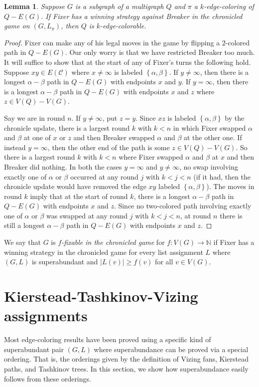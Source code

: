 \documentclass[12pt,reqno]{amsart}
\theoremstyle{plain}
\newtheorem{lem}[thm]{Lemma}
\theoremstyle{definition}
\theoremstyle{remark}
\newcommand{\fancy}[1]{\mathcal{#1}}
\newcommand{\C}[1]{\fancy{C}_{#1}}
\newcommand{\IN}{\mathbb{N}}
\newcommand{\set}[1]{\left\{ #1 \right\}}
\newcommand{\card}[1]{\left|#1\right|}
\newcommand{\func}[3]{#1\colon #2 \rightarrow #3}
\renewcommand{\C}{\fancy{C}}
\begin{document}
\begin{lem}\label{WinningChronicledGameEdgeColors}
Suppose $G$ is a subgraph of a multigraph $Q$ and $\pi$ a $k$-edge-coloring of 
$Q - E(G)$.  If Fixer has a winning strategy against Breaker in the chronicled
game on $(G, L_\pi)$, then $Q$ is $k$-edge-colorable.
\end{lem}
\begin{proof}
Fixer can make any of his legal moves in the game by flipping a $2$-colored path in $Q - E(G)$. Our only worry is that we have restricted Breaker too much.  It will suffice to show that at the start of any of Fixer's turns the following hold. Suppose $xy \in E(\C)$ where $x \ne \infty$ is labeled $\set{\alpha, \beta}$. If $y \ne \infty$, then there is a longest $\alpha-\beta$ path in $Q - E(G)$ with endpoints $x$ and $y$.  If $y = \infty$, then there is a longest $\alpha-\beta$ path in $Q - E(G)$ with endpoints $x$ and $z$ where $z \in V(Q) - V(G)$.

Say we are in round $n$. If $y \ne \infty$, put $z = y$. Since
$xz$ is labeled $\set{\alpha, \beta}$ by the chronicle update, there is a
largest round $k$ with $k < n$ in which Fixer swapped $\alpha$ and $\beta$ at
one of $x$ or $z$ and then Breaker swapped $\alpha$ and $\beta$ at the other
one.  If instead $y = \infty$, then the other end of the path is some $z \in
V(Q) - V(G)$.  So there is a largest round $k$ with $k < n$ where Fixer swapped
$\alpha$ and $\beta$ at $x$ and then Breaker did nothing.  In both the cases
$y=\infty$ and $y\ne \infty$, no swap involving exactly one of $\alpha$ or
$\beta$ occurred at any round $j$ with $k < j < n$ (if it had, then the
chronicle update would have removed the edge $xy$ labeled
$\set{\alpha,\beta}$).  The moves in round $k$ imply that at the start of round
$k$, there is a longest $\alpha-\beta$ path in $Q - E(G)$ with endpoints $x$
and $z$.  Since no two-colored path involving exactly one of $\alpha$ or
$\beta$ was swapped at any round $j$ with $k < j < n$, at round $n$ there is
still a longest $\alpha-\beta$ path in $Q - E(G)$ with endpoints $x$ and $z$.
\end{proof}


We say that $G$ is \emph{$f$-fixable in the chronicled game} for $\func{f}{V(G)}{\IN}$ if Fixer has a winning strategy in the 
chronicled game for every list assignment $L$ where $(G, L)$ is superabundant and $\card{L(v)} \ge f(v)$ for all $v \in V(G)$.

\section{Kierstead-Tashkinov-Vizing assignments}
Most edge-coloring results have been proved using a specific kind of
superabundant pair $(G, L)$ where superabundance can be proved via a special
ordering. That is, the orderings given by the definition of Vizing fans,
Kierstead paths, and Tashkinov trees.  In this section, we show how
superabundance easily follows from these orderings.
\end{document}
